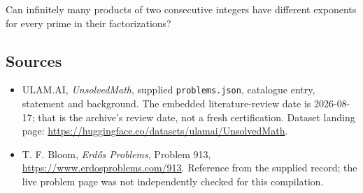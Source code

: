 \documentclass[11pt,a4paper]{article}
\begin{document}
Can infinitely many products of two consecutive integers have different exponents for every prime in their factorizations?

\subsection{Sources}

{\small

\begin{itemize}

\item[\hypertarget{source:statement:1}{S1}] ULAM.AI, \emph{UnsolvedMath}, supplied \texttt{problems.json}, catalogue entry, statement and background. The embedded literature-review date is 2026-08-17; that is the archive’s review date, not a fresh certification. Dataset landing page: \url{https://huggingface.co/datasets/ulamai/UnsolvedMath}.

\item[\hypertarget{source:statement:2}{S2}] T. F. Bloom, \emph{Erdős Problems}, Problem 913, \url{https://www.erdosproblems.com/913}. Reference from the supplied record; the live problem page was not independently checked for this compilation.

\end{itemize}

}

\label{end:statement}
\end{document}
